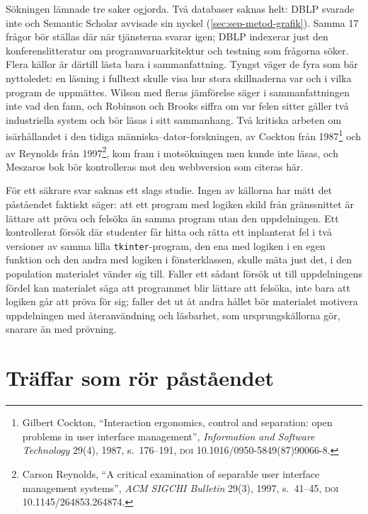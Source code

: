 Sökningen lämnade tre saker ogjorda.  Två databaser saknas helt: DBLP
svarade inte och Semantic Scholar avvisade sin nyckel
(\cref{sec:sep-metod-grafik}).  Samma 17 frågor bör ställas där när
tjänsterna svarar igen; DBLP indexerar just den konferenslitteratur om
programvaruarkitektur och testning som frågorna söker.  Flera källor är
därtill lästa bara i sammanfattning.  Tyngst väger de fyra som bär
nyttoledet\autocite{AlkhalidLabiche2017,Coppola2019Fragility,%
MemonXie2005,Lou2016Android}: en läsning i fulltext skulle visa hur stora
skillnaderna var och i vilka program de uppmättes.  Wilson med fleras
jämförelse\autocite{Wilson2022MVVM} säger i sammanfattningen inte vad den
fann, och Robinson och Brooks siffra om var felen sitter\autocite{%
RobinsonBrooks2009} gäller två industriella system och bör läsas i sitt
sammanhang.  Två kritiska arbeten om isärhållandet i den tidiga
människa--dator-forskningen, av Cockton från 1987\footnote{Gilbert
Cockton, \enquote{Interaction ergonomics, control and separation: open
problems in user interface management}, \emph{Information and Software
Technology} 29(4), 1987, s.~176--191, \textsc{doi}
10.1016/0950-5849(87)90066-8.} och
av Reynolds från 1997\footnote{Carson Reynolds, \enquote{A critical
examination of separable user interface management systems}, \emph{ACM
SIGCHI Bulletin} 29(3), 1997, s.~41--45, \textsc{doi}
10.1145/264853.264874.}, kom fram i motsökningen men kunde inte läsas,
och Meszaros bok bör kontrolleras mot den webbversion som citeras här.

För ett säkrare svar saknas ett slags studie.  Ingen av källorna har
mätt det påståendet faktiskt säger: att ett program med logiken skild
från gränssnittet är lättare att pröva och felsöka än samma program utan
den uppdelningen.  Ett kontrollerat försök där studenter får hitta och
rätta ett inplanterat fel i två versioner av samma lilla
\texttt{tkinter}-program, den ena med logiken i en egen
funktion och den andra med logiken i fönsterklassen, skulle mäta just
det, i den population materialet vänder sig till.  Faller ett sådant
försök ut till uppdelningens fördel kan materialet säga att programmet
blir lättare att felsöka, inte bara att logiken går att pröva för sig;
faller det ut åt andra hållet bör materialet motivera uppdelningen med
återanvändning och läsbarhet, som ursprungskällorna gör, snarare än med
prövning.

\section{Träffar som rör påståendet}
\label{sec:sep-traffar-grafik}

